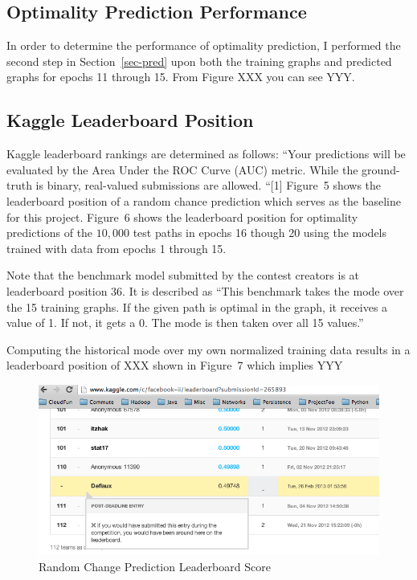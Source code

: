 \documentclass{article} %
\begin{document}
\subsection{Optimality Prediction Performance}

In order to determine the performance of optimality prediction, I performed
the second step in Section~\ref{sec-pred} upon both the training graphs and
predicted graphs for epochs 11 through 15.  From Figure XXX you can see YYY.

\subsection{Kaggle Leaderboard Position}

Kaggle leaderboard rankings are determined as follows: ``Your predictions
will be evaluated by the Area Under the ROC Curve (AUC) metric.  While the
ground-truth is binary, real-valued submissions are allowed. ``[1]  Figure~5
shows the leaderboard position of a random chance prediction which 
serves as the baseline for this project.  Figure~6 shows the leaderboard
position for optimality predictions of the $10,000$ test paths in epochs 16
though 20 using the models trained with data from epochs 1 through 15.

Note that the benchmark model submitted by the contest creators is at
leaderboard position 36.  It is described as ``This benchmark takes the mode over the 15 training graphs. If the given path is optimal in the graph, it receives a value of 1. If not, it gets a 0. The mode is then taken over all 15 values.''

Computing the historical mode over my own normalized training data results
in a leaderboard position of XXX shown in Figure~7 which implies YYY

\begin{figure}
  \begin{center}
    \includegraphics[scale=.4]{randomPredictions.png}
  \end{center}
  \caption{Random Change Prediction Leaderboard Score}
\end{figure}
\end{document}
